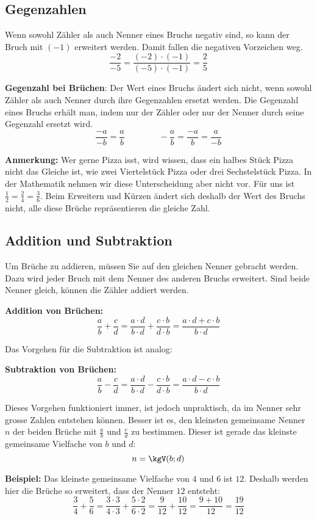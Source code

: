 \subsection{Gegenzahlen}

Wenn sowohl Zähler als auch Nenner eines Bruchs negativ sind, so kann der Bruch mit $(-1)$ erweitert werden. Damit fallen die negativen Vorzeichen weg.
\[
  \frac{-2}{-5} = \frac{(-2)\cdot(-1)}{(-5)\cdot(-1)} = \frac{2}{5}
\]
\begin{theorem}
  \textbf{Gegenzahl bei Brüchen}: Der Wert eines Bruchs ändert sich nicht, wenn sowohl Zähler als auch Nenner durch ihre Gegenzahlen ersetzt werden. Die Gegenzahl eines Bruchs erhält man, indem nur der Zähler oder nur der Nenner durch seine Gegenzahl ersetzt wird.
  \[
    \frac{-a}{-b} = \frac{a}{b} \qquad\qquad -\frac{a}{b} = \frac{-a}{b} = \frac{a}{-b}
  \]
\end{theorem}

\textbf{Anmerkung:} Wer gerne Pizza isst, wird wissen, dass ein halbes Stück Pizza nicht das Gleiche ist, wie zwei Viertelstück Pizza oder drei Sechstelstück Pizza. In der Mathematik nehmen wir diese Unterscheidung aber nicht vor. Für uns ist $\frac{1}{2} = \frac{2}{4} = \frac{3}{6}$. Beim Erweitern und Kürzen ändert sich deshalb der Wert des Bruchs nicht, alle diese Brüche repräsentieren die gleiche Zahl.


\subsection{Addition und Subtraktion}

Um Brüche zu addieren, müssen Sie auf den gleichen Nenner gebracht werden. Dazu wird jeder Bruch mit dem Nenner des anderen Bruchs erweitert. Sind beide Nenner gleich, können die Zähler addiert werden.
\begin{theorem}
  \textbf{Addition von Brüchen:}
  \[
    \frac{a}{b}+\frac{c}{d} = \frac{a\cdot d}{b\cdot d}+\frac{c\cdot b}{d\cdot b} = \frac{a\cdot d+c\cdot b}{b\cdot d}
  \]
\end{theorem}
Das Vorgehen für die Subtraktion ist analog:
\begin{theorem}
  \textbf{Subtraktion von Brüchen:}
  \[
    \frac{a}{b}-\frac{c}{d} = \frac{a\cdot d}{b\cdot d}-\frac{c\cdot b}{d\cdot b} = \frac{a\cdot d-c\cdot b}{b\cdot d}
  \]
\end{theorem}
Dieses Vorgehen funktioniert immer, ist jedoch unpraktisch, da im Nenner sehr grosse Zahlen entstehen können. Besser ist es, den kleinsten gemeinsame Nenner $n$ der beiden Brüche mit $\frac{a}{b}$ und $\frac{c}{d}$ zu bestimmen. Dieser ist gerade das kleinste gemeinsame Vielfache von $b$ und $d$:
\[
  n = \kgV(b;d)
\]
\begin{example}
  \textbf{Beispiel:} Das kleinste gemeinsame Vielfache von $4$ und $6$ ist $12$. Deshalb werden hier die Brüche so erweitert, dass der Nenner $12$ entsteht:
  \[
    \frac{3}{4}+\frac{5}{6} = \frac{3\cdot 3}{4\cdot 3}+\frac{5\cdot 2}{6\cdot 2} = \frac{9}{12}+\frac{10}{12} = \frac{9+10}{12} = \frac{19}{12}
  \]
\end{example}

